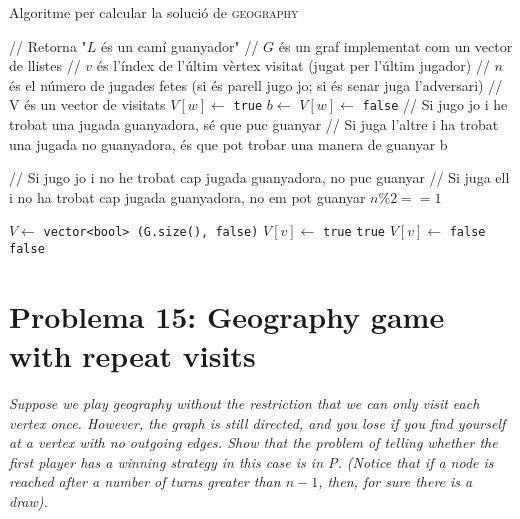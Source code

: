 \documentclass[a4paper]{article}
\begin{document}
\begin{algorithm}[H]
	\caption{Algoritme per calcular la solució de \textsc{geography}}
	\begin{algorithmic}[1]
		\State // Retorna "$L$ és un camí guanyador"
		\State // $G$ és un graf implementat com un vector de llistes
		\State // $v$ és l'índex de l'últim vèrtex visitat (jugat per l'últim jugador)
		\State // $n$ és el número de jugades fetes (si és parell jugo jo; si és senar juga l'adversari)
		\State // V és un vector de visitats
					\State $V[w] \gets$ \texttt{true}
					\State $b \gets$ 
					\State $V[w] \gets$ \texttt{false}
					\State
					\State // Si jugo jo i he trobat una jugada guanyadora, sé que puc guanyar
					\State // Si juga l'altre i ha trobat una jugada no guanyadora, és que pot trobar una manera de guanyar
						\State \Return b
					\EndIf
				\EndIf
			\EndFor
			
			\State // Si jugo jo i no he trobat cap jugada guanyadora, no puc guanyar
			\State // Si juga ell i no ha trobat cap jugada guanyadora, no em pot guanyar
			\State \Return $n\%2 == 1$
		\EndFunction
	\end{algorithmic}
\end{algorithm}

\begin{algorithm}[!h]
	\begin{algorithmic}[1]
			\State $V \gets$  \texttt{vector<bool> (G.size(), false)}
				\State $V[v] \gets$ \texttt{true}
					\State \Return \texttt{true}
				\EndIf
				\State $V[v] \gets$ \texttt{false}
			\EndFor
			\State \Return \texttt{false}
		\EndFunction
	\end{algorithmic}
\end{algorithm}

\section{Problema 15: Geography game with repeat visits}
\emph{Suppose we play geography without the restriction that we can only visit each vertex once. However, the graph is still directed, and you lose if you find yourself at a vertex with no outgoing edges. Show that the problem of telling whether the first player has a winning strategy in this case is in P. (Notice that if a node is reached after a number of turns greater than $n − 1$, then, for sure there is a draw).}
\end{document}
